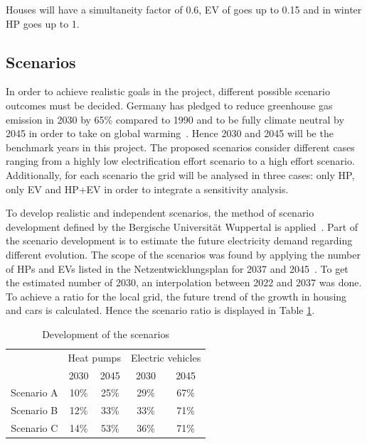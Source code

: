 Houses will have a simultaneity factor of 0.6, EV of goes up to 0.15 and in winter HP goes up to 1. %


\subsection{Scenarios}

In order to achieve realistic goals in the project, different possible scenario outcomes must be decided. Germany has pledged to reduce greenhouse gas emission in 2030 by 65\% compared to 1990 and to be fully climate neutral by 2045 in order to take on global warming~\cite{bmwk2022}. Hence 2030 and 2045 will be the benchmark years in this project. The proposed scenarios consider different cases ranging from a highly low electrification effort scenario to a high effort scenario. Additionally, for each scenario the grid will be analysed in three cases: only HP, only EV and HP+EV in order to integrate a sensitivity analysis. 

To develop realistic and independent scenarios, the method of scenario development defined by the Bergische Universität Wuppertal is applied~\cite{Planung}. Part of the scenario development is to estimate the future electricity demand regarding different evolution. The scope of the scenarios was found by applying the number of HPs and EVs listed in the Netzentwicklungsplan for 2037 and 2045~\cite{netzentwicklungsplan}. To get the estimated number of 2030, an interpolation between 2022 and 2037 was done. To achieve a ratio for the local grid, the future trend of the growth in housing and cars is calculated. Hence the scenario ratio is displayed in Table \ref{tab:scenario}.

\begin{table}[h]
    \centering
    \caption{Development of the scenarios}
    \begin{tabular}{c|cc|cc|}
    \cline{2-5}
         & \multicolumn{2}{c|}{Heat pumps} & \multicolumn{2}{c|}{Electric vehicles}\\
         & 2030 & 2045 & 2030 & 2045 \\
        \hline
        \multicolumn{1}{|c|}{Scenario A} & 10\%& 25\%& 29\% & 67\%\\
         \multicolumn{1}{|c|}{Scenario B} & 12\%&33\%&33\%&71\% \\
          \multicolumn{1}{|c|}{Scenario C} & 14\%&53\%&36\%&71\% \\
          \hline
    \end{tabular}
    \label{tab:scenario}
\end{table}

